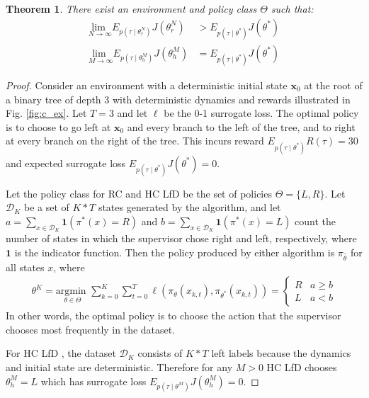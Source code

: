 \documentclass[10pt, conference]{ieeeconf}      %
\newtheorem{theorem}{Theorem}[section]
\newcommand{\bx}{\mathbf{x}}
\newcommand{\mD}{\mathcal{D}}
\newcommand{\ns}{HC LfD }
\begin{document}
\begin{theorem}
There exist an environment and policy class $\Theta$ such that:
\vspace{-2ex}
\begin{align*}
	\underset{N \rightarrow \infty}{\text{lim }} E_{p(\tau \mid \theta_{r}^N) } J(\theta_{r}^N) &> E_{p(\tau \mid \theta^*)} J(\theta^*) \\
	\underset{M \rightarrow \infty}{\text{lim }} E_{p(\tau \mid \theta_{h}^M) } J(\theta_{h}^M) &= E_{p(\tau \mid \theta^*)} J(\theta^*)
\end{align*} 
\end{theorem}

\begin{proof}
Consider an environment with a deterministic initial state $\bx_0$ at the root of a binary tree of depth 3 with deterministic dynamics and rewards illustrated in Fig. \ref{fig:c_ex}.
Let $T = 3$ and let $\ell$ be the 0-1 surrogate loss.
The optimal policy is to choose to go left at $\bx_0$ and every branch to the left of the tree, and to right at every branch on the right of the tree.
This incurs reward $E_{p(\tau \mid \theta^*)} R(\tau) = 30$ and expected surrogate loss $E_{p(\tau \mid \theta^*)} J(\theta^*) = 0$.

Let the policy class for RC and HC LfD be the set of policies $\Theta = \{L, R\}$.
Let $\mD_K$ be a set of $K * T$ states generated by the algorithm, and let $a = \sum_{x \in \mD_K} \mathbf{1}(\pi^*(x) = R)$ and $b = \sum_{x \in \mD_K} \mathbf{1}(\pi^*(x) = L)$ count the number of states in which the supervisor chose right and left, respectively, where $\mathbf{1}$ is the indicator function. 
Then the policy produced by either algorithm is $\pi_{\hat{\theta}}$ for all states $x$, where
\vspace{-2ex}
\begin{align*}
	\theta^K = \underset{\theta \in \Theta}{\text{argmin }} \sum_{k=0}^K \sum_{t=0}^T \ell(\pi_{\theta}(x_{k,t}), \pi_{\theta^*}(x_{k,t})) = \left\{ \begin{array}{cc} R & a \geq b \\ L & a < b \end{array} \right.
\end{align*}
\noindent In other words, the optimal policy is to choose the action that the supervisor chooses most frequently in the dataset.

For \ns, the dataset $\mD_K$ consists of $K * T$ left labels because the dynamics and initial state are deterministic.
Therefore for any $M > 0$  HC LfD chooses $\theta_{h}^M = L$ which has surrogate loss $E_{p(\tau \mid \theta^M)} J(\theta_{h}^M) = 0$.


\end{proof}
\end{document}
